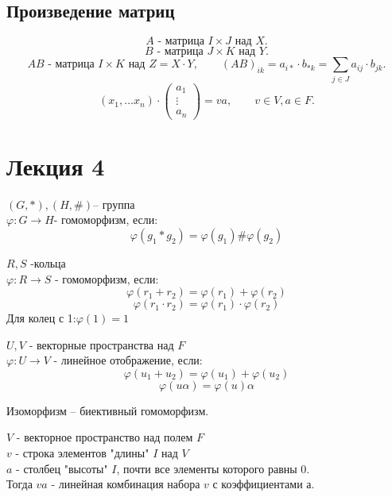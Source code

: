 \documentclass[12pt]{report}
\begin{document}
\subsection{Произведение матриц}
\[
    A \mbox{ - матрица } I\times J \mbox{ над } X
.\] 
\[
    B \mbox{ - матрица } J\times K \mbox{ над } Y
.\] 
\[
    AB \mbox{ - матрица } I\times K \mbox{ над } Z = X \cdot Y, \qquad (AB)_{ik} = a_{i*} \cdot b_{*k} = \sum\limits_{j\in J} a_{ij} \cdot b_{jk}
.\] 
\[
(x_1, \ldots x_n) \cdot \left ( \begin{array}{c}a_1\\ \vdots\\ a_n \end{array}\right )=va, \qquad v \in V, a \in F
.\] 
\section{Лекция 4}
\begin{defn}
$(G, *), (H, \#) $-- группа \\
$\varphi: G \to H $- гомоморфизм, если: 
$$\varphi (g_1 * g_2) = \varphi(g_1) \# \varphi(g_2)$$
\end{defn}

\begin{defn}
$R, S$ -кольца\\
$\varphi: R\to S$ - гомоморфизм, если:
$$\varphi(r_1 + r_2) = \varphi(r_1) + \varphi(r_2)$$ 
$$\varphi(r_1 \cdot r_2) = \varphi(r_1) \cdot \varphi(r_2)$$
Для колец с 1:$\varphi(1) = 1$
\end{defn}

\begin{defn}
$U, V$ - векторные пространства над $F$\\
$\varphi: U \to V$ - линейное отображение, если:
$$\varphi(u_1 + u_2) = \varphi(u_1) + \varphi(u_2)$$
$$\varphi(u \alpha) = \varphi(u) \alpha$$
\end{defn}

\begin{note}
Изоморфизм -- биективный гомоморфизм.
\end{note}

\begin{defn}
$V$ - векторное пространство над полем $F$\\
$v$ - строка элементов "длины" $I$ над $V$\\
$a$ - столбец "высоты" $I$, почти все элементы которого равны 0.\\
Тогда $va$ - линейная комбинация набора $v$ с коэффициентами $а$.\\
\end{defn}
\end{document}
